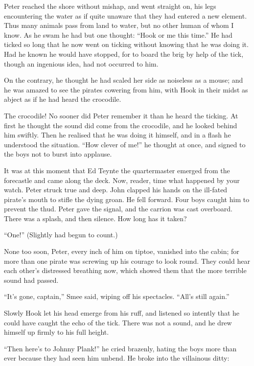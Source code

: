 Peter reached the shore without mishap, and went straight on, his legs
encountering the water as if quite unaware that they had entered a new
element. Thus many animals pass from land to water, but no other human
of whom I know. As he swam he had but one thought: ``Hook or me this
time.'' He had ticked so long that he now went on ticking without
knowing that he was doing it. Had he known he would have stopped, for
to board the brig by help of the tick, though an ingenious idea, had
not occurred to him.

On the contrary, he thought he had scaled her side as noiseless as a
mouse; and he was amazed to see the pirates cowering from him, with
Hook in their midst as abject as if he had heard the crocodile.

The crocodile! No sooner did Peter remember it than he heard the
ticking. At first he thought the sound did come from the crocodile, and
he looked behind him swiftly. Then he realised that he was doing it
himself, and in a flash he understood the situation. ``How clever of
me!'' he thought at once, and signed to the boys not to burst into
applause.

It was at this moment that Ed Teynte the quartermaster emerged from the
forecastle and came along the deck. Now, reader, time what happened by
your watch. Peter struck true and deep. John clapped his hands on the
ill-fated pirate's mouth to stifle the dying groan. He fell forward.
Four boys caught him to prevent the thud. Peter gave the signal, and
the carrion was cast overboard. There was a splash, and then silence.
How long has it taken?

``One!'' (Slightly had begun to count.)

None too soon, Peter, every inch of him on tiptoe, vanished into the
cabin; for more than one pirate was screwing up his courage to look
round. They could hear each other's distressed breathing now, which
showed them that the more terrible sound had passed.

``It's gone, captain,'' Smee said, wiping off his spectacles. ``All's
still again.''

Slowly Hook let his head emerge from his ruff, and listened so intently
that he could have caught the echo of the tick. There was not a sound,
and he drew himself up firmly to his full height.

``Then here's to Johnny Plank!'' he cried brazenly, hating the boys more
than ever because they had seen him unbend. He broke into the
villainous ditty:

